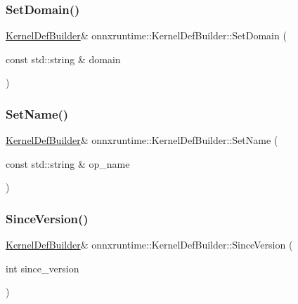 \subsubsection{\texorpdfstring{Set\+Domain()}{SetDomain()}}
{\footnotesize\ttfamily \mbox{\hyperlink{classonnxruntime_1_1KernelDefBuilder}{Kernel\+Def\+Builder}}\& onnxruntime\+::\+Kernel\+Def\+Builder\+::\+Set\+Domain (\begin{DoxyParamCaption}\item[{const std\+::string \&}]{domain }\end{DoxyParamCaption})\hspace{0.3cm}{\ttfamily [inline]}}

\mbox{\label{classonnxruntime_1_1KernelDefBuilder_a48ebec00826acee0353169ba1a31be91}} 
\subsubsection{\texorpdfstring{Set\+Name()}{SetName()}}
{\footnotesize\ttfamily \mbox{\hyperlink{classonnxruntime_1_1KernelDefBuilder}{Kernel\+Def\+Builder}}\& onnxruntime\+::\+Kernel\+Def\+Builder\+::\+Set\+Name (\begin{DoxyParamCaption}\item[{const std\+::string \&}]{op\+\_\+name }\end{DoxyParamCaption})\hspace{0.3cm}{\ttfamily [inline]}}

\mbox{\label{classonnxruntime_1_1KernelDefBuilder_ae0ddc824b271a1cb40f689f162049784}} 
\subsubsection{\texorpdfstring{Since\+Version()}{SinceVersion()}\hspace{0.1cm}{\footnotesize\ttfamily [1/2]}}
{\footnotesize\ttfamily \mbox{\hyperlink{classonnxruntime_1_1KernelDefBuilder}{Kernel\+Def\+Builder}}\& onnxruntime\+::\+Kernel\+Def\+Builder\+::\+Since\+Version (\begin{DoxyParamCaption}\item[{int}]{since\+\_\+version }\end{DoxyParamCaption})\hspace{0.3cm}{\ttfamily [inline]}}

